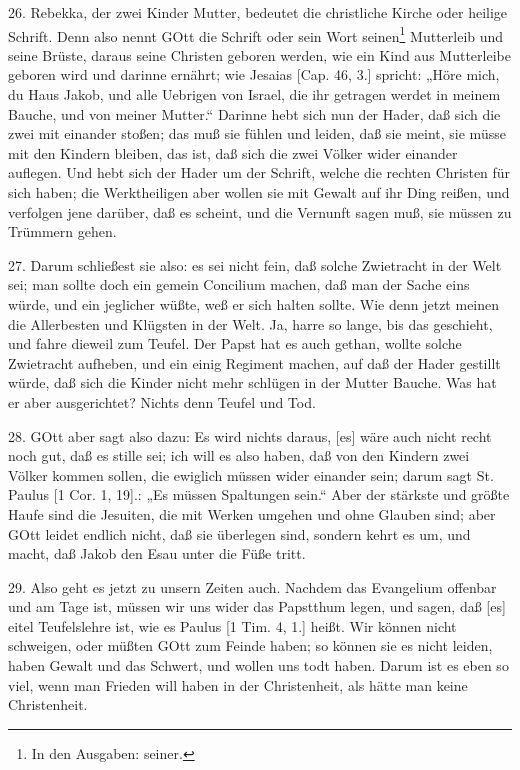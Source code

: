 26. Rebekka, der zwei Kinder Mutter, bedeutet die christliche Kirche oder heilige Schrift. Denn also nennt GOtt die Schrift oder sein Wort seinen\footnote{In den Ausgaben: seiner.} Mutterleib und seine Brüste, daraus seine Christen geboren werden, wie ein Kind aus Mutterleibe geboren wird und darinne ernährt; wie Jesaias [Cap. 46, 3.] spricht: „Höre mich, du Haus Jakob, und alle Uebrigen von Israel, die ihr getragen werdet in meinem Bauche, und von meiner Mutter.“ Darinne hebt sich nun der Hader, daß sich die zwei mit einander stoßen; das muß sie fühlen und leiden, daß sie meint, sie müsse mit den Kindern bleiben, das ist, daß sich die zwei Völker wider einander auflegen. Und hebt sich der Hader um der Schrift, welche die rechten Christen für sich haben; die Werktheiligen aber wollen sie mit Gewalt auf ihr Ding reißen, und verfolgen jene darüber, daß es scheint, und die Vernunft sagen muß, sie müssen zu Trümmern gehen.

27. Darum schließest sie also: es sei nicht fein, daß solche Zwietracht in der Welt sei; man sollte doch ein gemein Concilium machen, daß man der Sache eins würde, und ein jeglicher wüßte, weß er sich halten sollte. Wie denn jetzt meinen die Allerbesten und Klügsten in der Welt. Ja, harre
so lange, bis das geschieht, und fahre dieweil zum Teufel. Der Papst hat es auch gethan, wollte solche Zwietracht aufheben, und ein einig Regiment machen, auf daß der Hader gestillt würde, daß sich die Kinder nicht mehr schlügen in der Mutter Bauche. Was hat er aber ausgerichtet? Nichts denn Teufel und Tod.

28. GOtt aber sagt also dazu: Es wird nichts daraus, [es] wäre auch nicht recht noch gut, daß es stille sei; ich will es also haben, daß von den Kindern zwei Völker kommen sollen, die ewiglich müssen wider einander sein; darum sagt St. Paulus [1 Cor. 1, 19].: „Es müssen Spaltungen sein.“ Aber der stärkste und größte Haufe sind die Jesuiten, die mit Werken umgehen und ohne Glauben sind; aber GOtt leidet endlich nicht, daß sie überlegen sind, sondern kehrt es um, und macht, daß Jakob den Esau unter die Füße tritt.

29. Also geht es jetzt zu unsern Zeiten auch. Nachdem das Evangelium offenbar und am Tage ist, müssen wir uns wider das Papstthum legen, und sagen, daß [es] eitel Teufelslehre ist, wie es Paulus [1 Tim. 4, 1.] heißt. Wir können nicht schweigen, oder müßten GOtt zum Feinde haben; so können sie es nicht leiden, haben Gewalt und das Schwert, und wollen uns todt haben. Darum ist es eben so viel, wenn man Frieden will haben in der Christenheit, als hätte man keine Christenheit.

